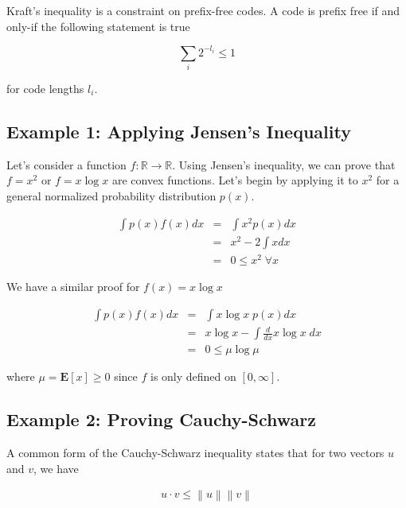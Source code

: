 \documentclass[a4paper,11pt]{book}
\begin{document}
Kraft's inequality is a constraint on prefix-free codes. A code is prefix free if and only-if the following statement is true

\begin{equation}
\sum_{i} 2^{-l_{i}} \leq 1
\end{equation}

for code lengths $l_{i}$.


\subsection{Example 1: Applying Jensen's Inequality}

Let's consider a function $f: \mathbb{R} \rightarrow \mathbb{R}$. Using Jensen's inequality, we can prove that $f=x^{2}$ or $f=x\log x$ are convex functions. Let's begin by applying it to $x^{2}$ for a general normalized probability distribution $p(x)$.

\begin{eqnarray*}
\int p(x)f(x)dx & = & \int x^{2}p(x)dx\\
&=& x^{2} - 2\int xdx\\
&=& 0 \leq x^{2} \; \forall x
\end{eqnarray*}

We have a similar proof for $f(x) = x\log x$

\begin{eqnarray*}
\int p(x)f(x)dx & = & \int x\log x\; p(x)dx\\
&=& x\log x - \int \frac{d}{dx}x\log x\;dx\\
&=& 0 \leq \mu \log \mu
\end{eqnarray*}

where $\mu = \mathbf{E}[x] \geq 0$ since $f$ is only defined on $[0, \infty]$.

\subsection{Example 2: Proving Cauchy-Schwarz}

A common form of the Cauchy-Schwarz inequality states that for two vectors $u$ and $v$, we have

\newcommand\norm[1]{\left\lVert#1\right\rVert}
\begin{eqnarray*}
u \cdot v  \leq \norm{u}\norm{v}
\end{eqnarray*}
\end{document}
